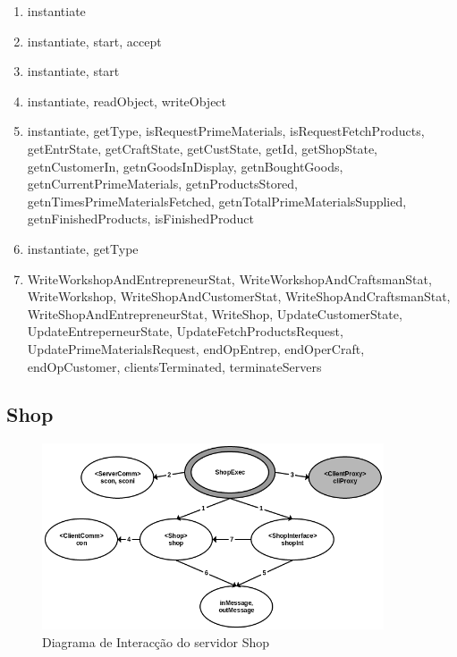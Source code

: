 \documentclass[11pt,a4paper]{report}
\begin{document}
\begin{enumerate}
\itemsep-0.4em 
\item instantiate
\item instantiate, start, accept
\item instantiate, start
\item instantiate, readObject, writeObject
\item instantiate, getType, isRequestPrimeMaterials, isRequestFetchProducts, getEntrState, getCraftState, getCustState, getId, getShopState, getnCustomerIn, getnGoodsInDisplay, getnBoughtGoods, getnCurrentPrimeMaterials, getnProductsStored, getnTimesPrimeMaterialsFetched, getnTotalPrimeMaterialsSupplied, getnFinishedProducts, isFinishedProduct
\item instantiate, getType
\item WriteWorkshopAndEntrepreneurStat, WriteWorkshopAndCraftsmanStat, WriteWorkshop, WriteShopAndCustomerStat, WriteShopAndCraftsmanStat, WriteShopAndEntrepreneurStat, WriteShop, UpdateCustomerState, UpdateEntreperneurState, UpdateFetchProductsRequest, UpdatePrimeMaterialsRequest, endOpEntrep, endOperCraft, endOpCustomer, clientsTerminated, terminateServers
\end{enumerate}

\newpage
\subsection{Shop}

\begin{figure}[h]
    \centering
    \includegraphics[width=0.9\textwidth]{images/shop.png}
    \caption{Diagrama de Interacção do servidor Shop}
    \label{fig:awesome_image}
\end{figure}
\end{document}
